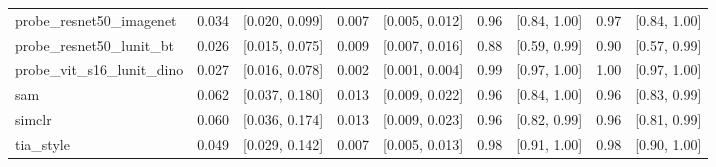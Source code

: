 \begin{tabular}{lrrrrrrrr}
probe\_resnet50\_imagenet & 0.034 & [0.020, 0.099] & 0.007 & [0.005, 0.012] & 0.96 & [0.84, 1.00] & 0.97 & [0.84, 1.00] \\
probe\_resnet50\_lunit\_bt & 0.026 & [0.015, 0.075] & 0.009 & [0.007, 0.016] & 0.88 & [0.59, 0.99] & 0.90 & [0.57, 0.99] \\
probe\_vit\_s16\_lunit\_dino & 0.027 & [0.016, 0.078] & 0.002 & [0.001, 0.004] & 0.99 & [0.97, 1.00] & 1.00 & [0.97, 1.00] \\
sam & 0.062 & [0.037, 0.180] & 0.013 & [0.009, 0.022] & 0.96 & [0.84, 1.00] & 0.96 & [0.83, 0.99] \\
simclr & 0.060 & [0.036, 0.174] & 0.013 & [0.009, 0.023] & 0.96 & [0.82, 0.99] & 0.96 & [0.81, 0.99] \\
tia\_style & 0.049 & [0.029, 0.142] & 0.007 & [0.005, 0.013] & 0.98 & [0.91, 1.00] & 0.98 & [0.90, 1.00] \\
\bottomrule
\end{tabular}
